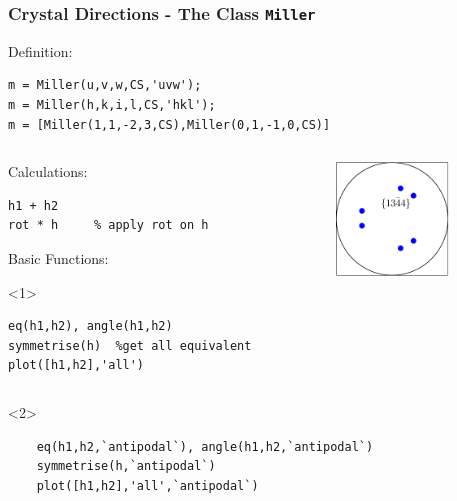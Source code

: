 \begin{frame}[fragile]
  \frametitle{Crystal Directions - The \MTEX Class \texttt{\bf Miller}}

  Definition:

\begin{lstlisting}
m = Miller(u,v,w,CS,'uvw');
m = Miller(h,k,i,l,CS,'hkl');
m = [Miller(1,1,-2,3,CS),Miller(0,1,-1,0,CS)]
\end{lstlisting}

\medskip

\begin{columns}
  \begin{column}{8.5cm}

    Calculations:

\begin{lstlisting}
h1 + h2
rot * h     % apply rot on h
\end{lstlisting}

    Basic Functions:

    \begin{onlyenv}<1>
\begin{lstlisting}
eq(h1,h2), angle(h1,h2)
symmetrise(h)  %get all equivalent
plot([h1,h2],'all')
\end{lstlisting}
    \end{onlyenv}

	\end{column}

  \begin{column}{3cm}
    \includegraphics[width=3cm]{pic/miller}
  \end{column}
\end{columns}


	\begin{onlyenv}


	\begin{lstlisting}
	eq(h1,h2,`antipodal`), angle(h1,h2,`antipodal`)
	symmetrise(h,`antipodal`)
	plot([h1,h2],'all',`antipodal`)
	\end{lstlisting}


    \end{onlyenv}


\end{frame}



